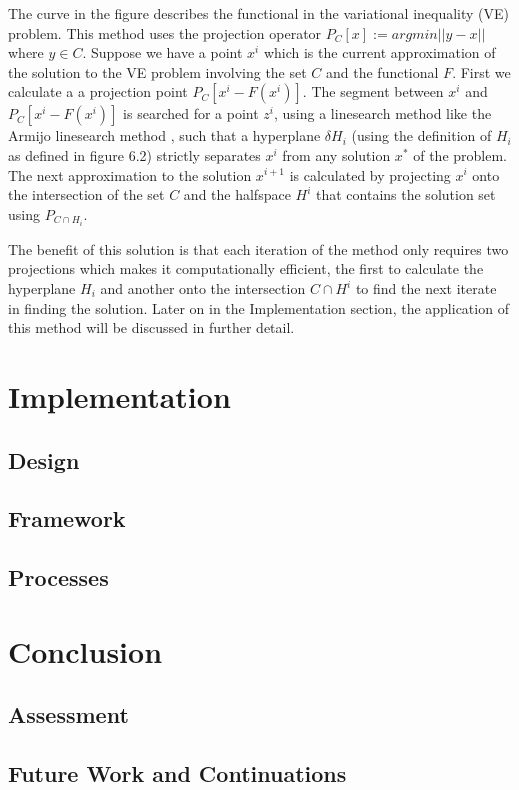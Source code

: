 \documentclass[a4paper, notitlepage]{report}
\begin{document}
The curve in the figure describes the functional in the variational inequality
(VE) problem. This method uses the projection operator \(P_C[x] := arg min ||y -
x||\) where \(y \in C\). Suppose we have a point \(x^i\) which is the current approximation of
the solution to the VE problem involving the set \(C\) and the functional \(F\).
First we calculate a a projection point \(P_C[x^i - F(x^i)]\). The segment between
\(x^i\) and \(P_C[x^i - F(x^i)]\) is searched for a point \(z^i\), using a linesearch
method like the Armijo linesearch method \cite{armijo1966minimization}, such that
a hyperplane \(\delta H_i\) (using the definition of \(H_i\) as defined in figure 6.2)
strictly separates \(x^i\) from any solution \(x^*\) of the problem. The next
approximation to the solution \(x^{i+1}\) is calculated by projecting \(x^i\) onto the
intersection of the set \(C\) and the halfspace \(H^i\) that contains the solution
set using \(P_{C \cap H_i}\).

The benefit of this solution is that each iteration of the method only requires
two projections which makes it computationally efficient, the first to calculate
the hyperplane \(H_i\) and another onto the intersection \(C \cap H^i\) to find the next
iterate in finding the solution. Later on in the Implementation section, the
application of this method will be discussed in further detail.
\part{Implementation}
\label{sec:orgff17240}
\chapter{Design}
\label{sec:orge4ac19e}
\chapter{Framework}
\label{sec:org14c6903}
\chapter{Processes}
\label{sec:org6bb5b55}
\part{Conclusion}
\label{sec:org3dfb478}
\chapter{Assessment}
\label{sec:org1b9adec}
\chapter{Future Work and Continuations}
\label{sec:org3926790}
\printbibliography
\appendix
\end{document}
